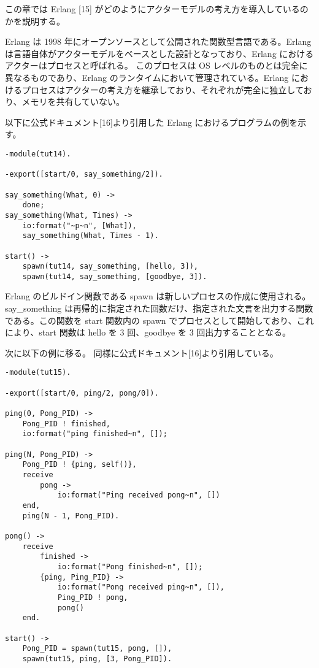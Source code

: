 この章では Erlang {[}15{]}
がどのようにアクターモデルの考え方を導入しているのかを説明する。

Erlang は 1998
年にオープンソースとして公開された関数型言語である。Erlang
は言語自体がアクターモデルをベースとした設計となっており、Erlang
におけるアクターはプロセスと呼ばれる。 このプロセスは OS
レベルのものとは完全に異なるものであり、Erlang
のランタイムにおいて管理されている。Erlang
におけるプロセスはアクターの考え方を継承しており、それぞれが完全に独立しており、メモリを共有していない。

以下に公式ドキュメント{[}16{]}より引用した Erlang
におけるプログラムの例を示す。

\begin{verbatim}
-module(tut14).

-export([start/0, say_something/2]).

say_something(What, 0) ->
    done;
say_something(What, Times) ->
    io:format("~p~n", [What]),
    say_something(What, Times - 1).

start() ->
    spawn(tut14, say_something, [hello, 3]),
    spawn(tut14, say_something, [goodbye, 3]).
\end{verbatim}

Erlang のビルドイン関数である spawn は新しいプロセスの作成に使用される。
say\_something
は再帰的に指定された回数だけ、指定された文言を出力する関数である。この関数を
start 関数内の spawn でプロセスとして開始しており、これにより、start
関数は hello を 3 回、goodbye を 3 回出力することとなる。

次に以下の例に移る。 同様に公式ドキュメント{[}16{]}より引用している。

\begin{verbatim}
-module(tut15).

-export([start/0, ping/2, pong/0]).

ping(0, Pong_PID) ->
    Pong_PID ! finished,
    io:format("ping finished~n", []);

ping(N, Pong_PID) ->
    Pong_PID ! {ping, self()},
    receive
        pong ->
            io:format("Ping received pong~n", [])
    end,
    ping(N - 1, Pong_PID).

pong() ->
    receive
        finished ->
            io:format("Pong finished~n", []);
        {ping, Ping_PID} ->
            io:format("Pong received ping~n", []),
            Ping_PID ! pong,
            pong()
    end.

start() ->
    Pong_PID = spawn(tut15, pong, []),
    spawn(tut15, ping, [3, Pong_PID]).
\end{verbatim}

